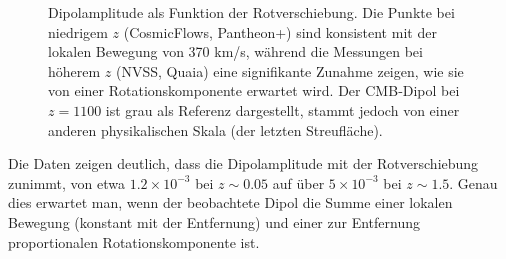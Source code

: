 \documentclass[11pt,a4paper]{article}
\begin{document}
	\begin{figure}[htbp]
		\centering
		\caption{Dipolamplitude als Funktion der Rotverschiebung. Die Punkte bei niedrigem \(z\) (CosmicFlows, Pantheon+) sind konsistent mit der lokalen Bewegung von 370 km/s, während die Messungen bei höherem \(z\) (NVSS, Quaia) eine signifikante Zunahme zeigen, wie sie von einer Rotationskomponente erwartet wird. Der CMB‑Dipol bei \(z=1100\) ist grau als Referenz dargestellt, stammt jedoch von einer anderen physikalischen Skala (der letzten Streufläche).}
		\label{fig:dipole_growth}
	\end{figure}
	
	Die Daten zeigen deutlich, dass die Dipolamplitude mit der Rotverschiebung zunimmt, von etwa \(1.2 \times 10^{-3}\) bei \(z\sim0.05\) auf über \(5\times10^{-3}\) bei \(z\sim1.5\). Genau dies erwartet man, wenn der beobachtete Dipol die Summe einer lokalen Bewegung (konstant mit der Entfernung) und einer zur Entfernung proportionalen Rotationskomponente ist.
	
\end{document}
